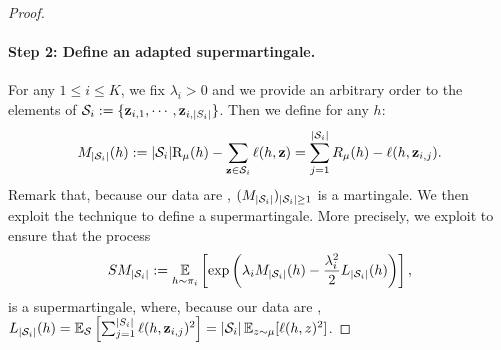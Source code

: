 \documentclass{article}
\begin{document}
\begin{proof}
\paragraph{Step 2: Define an adapted supermartingale. }
    For any $1\leq i \leq K$, we fix $\lambda_i>0$ and we provide an arbitrary order to the elements of $\S_i\defeq \{\z_{i,1},\cdots,\z_{i,|S_i|}\}$. Then we define for any $h$: 
    \begin{align*}
    M_{|\S_i|}(h)\defeq   |\S_i|\Risk_{\D}(h) - \sum_{\z\in\S_i} \loss(h, \z) = \sum_{j=1}^{|\S_i|} R_\D(h) - \loss(h,\z_{i,j}).
    \end{align*}
    Remark that, because our data are \iid, $(M_{|\S_i|})_{|\S_i|\geq 1}$ is a martingale. 
    We then exploit the technique \cite{chugg2023unified} to define a supermartingale. 
    More precisely, we exploit \cite[][Lemma A.2 and Lemma B.1]{chugg2023unified} to ensure that the process
    \begin{align*}
    SM_{|\S_i|} \defeq \EE_{h\sim \P_i} \LB\exp\left(\lambda_i M_{|\S_i|}(h) - \frac{\lambda_i^2}{2} L_{|\S_i|}(h) \right)\RB,
    \end{align*}
    is a supermartingale, where, because our data are \iid,  $L_{|\S_i|}(h) = \EE_{\S} \LB \sum_{j=1}^{|S_i|}\loss(h,\z_{i,j})^2 \RB = |\S_i| \EE_{z\sim \D}[\loss(h,z)^2]$. 


\end{proof}
\end{document}
